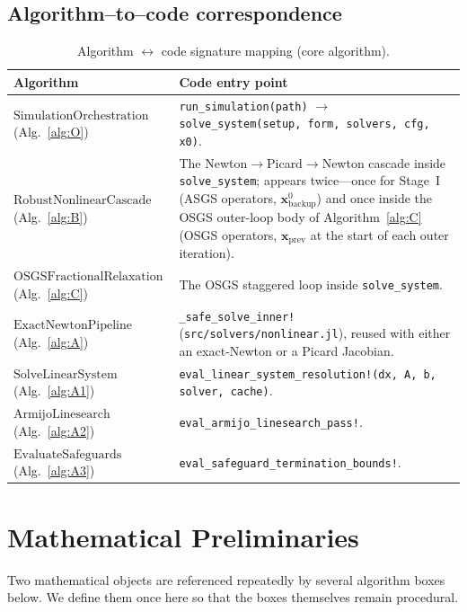 \documentclass{article}
\newcommand{\code}[1]{\texttt{\small #1}}
\begin{document}
\subsection{Algorithm--to--code correspondence}

\begin{table}[h]
\centering
\caption{Algorithm $\leftrightarrow$ code signature mapping (core algorithm).}
\label{tab:functions}
\small
\begin{tabularx}{\textwidth}{@{} l X @{}}
\toprule
\textbf{Algorithm} & \textbf{Code entry point} \\
\midrule
$\mathrm{SimulationOrchestration}$ (Alg.~\ref{alg:O})   & \code{run\_simulation(path)} $\to$ \code{solve\_system(setup, form, solvers, cfg, x0)}. \\
$\mathrm{RobustNonlinearCascade}$ (Alg.~\ref{alg:B})    & The Newton$\to$Picard$\to$Newton cascade inside \code{solve\_system}; appears twice---once for Stage~I (ASGS operators, $\boldsymbol{x}^0_{\mathrm{backup}}$) and once inside the OSGS outer-loop body of Algorithm~\ref{alg:C} (OSGS operators, $\boldsymbol{x}_{\mathrm{prev}}$ at the start of each outer iteration). \\
$\mathrm{OSGSFractionalRelaxation}$ (Alg.~\ref{alg:C})  & The OSGS staggered loop inside \code{solve\_system}. \\
$\mathrm{ExactNewtonPipeline}$ (Alg.~\ref{alg:A})       & \code{\_safe\_solve\_inner!} (\code{src/solvers/nonlinear.jl}), reused with either an exact-Newton or a Picard Jacobian. \\
$\mathrm{SolveLinearSystem}$ (Alg.~\ref{alg:A1})        & \code{eval\_linear\_system\_resolution!(dx, A, b, solver, cache)}. \\
$\mathrm{ArmijoLinesearch}$ (Alg.~\ref{alg:A2})         & \code{eval\_armijo\_linesearch\_pass!}. \\
$\mathrm{EvaluateSafeguards}$ (Alg.~\ref{alg:A3})       & \code{eval\_safeguard\_termination\_bounds!}. \\
\bottomrule
\end{tabularx}
\end{table}

\section{Mathematical Preliminaries}
\label{sec:math-prelim}

Two mathematical objects are referenced repeatedly by several
algorithm boxes below. We define them once here so that the boxes
themselves remain procedural.
\end{document}
